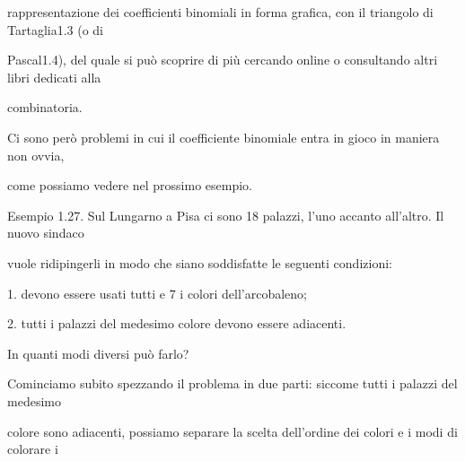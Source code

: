 \documentclass[a4paper,portrait,12pt]{article}
\begin{document}
\begin{flushleft}
rappresentazione dei coefficienti binomiali in forma grafica, con il triangolo di Tartaglia1.3 (o di
\end{flushleft}


\begin{flushleft}
Pascal1.4), del quale si pu\`{o} scoprire di più cercando online o consultando altri libri dedicati alla
\end{flushleft}


\begin{flushleft}
combinatoria.
\end{flushleft}


\begin{flushleft}
Ci sono per\`{o} problemi in cui il coefficiente binomiale entra in gioco in maniera non ovvia,
\end{flushleft}


\begin{flushleft}
come possiamo vedere nel prossimo esempio.
\end{flushleft}


\begin{flushleft}
Esempio 1.27. Sul Lungarno a Pisa ci sono 18 palazzi, l'uno accanto all'altro. Il nuovo sindaco
\end{flushleft}


\begin{flushleft}
vuole ridipingerli in modo che siano soddisfatte le seguenti condizioni:
\end{flushleft}


\begin{flushleft}
1. devono essere usati tutti e 7 i colori dell'arcobaleno;
\end{flushleft}


\begin{flushleft}
2. tutti i palazzi del medesimo colore devono essere adiacenti.
\end{flushleft}


\begin{flushleft}
In quanti modi diversi pu\`{o} farlo?
\end{flushleft}


\begin{flushleft}
Cominciamo subito spezzando il problema in due parti: siccome tutti i palazzi del medesimo
\end{flushleft}


\begin{flushleft}
colore sono adiacenti, possiamo separare la scelta dell'ordine dei colori e i modi di colorare i
\end{flushleft}
\end{document}
